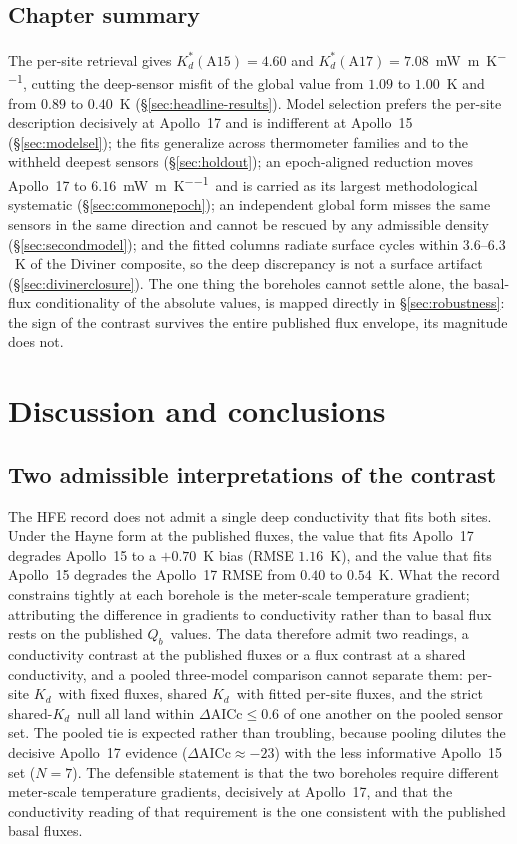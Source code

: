 \documentclass[11pt,a4paper,oneside]{report}
\newcommand{\Kd}{\ensuremath{K_d}}
\newcommand{\Kds}{\ensuremath{K_d^{*}}}
\newcommand{\Qb}{\ensuremath{Q_b}}
\newcommand{\mWmK}{\si{\milli\watt\per\meter\per\kelvin}}
\begin{document}
\section*{Chapter summary}
The per-site retrieval gives $\Kds(\mathrm{A15})=4.60$ and
$\Kds(\mathrm{A17})=7.08$~\mWmK, cutting the deep-sensor misfit of
the global value from $1.09$ to $1.00$~K and from $0.89$ to $0.40$~K
(\S\ref{sec:headline-results}). Model selection prefers the per-site
description decisively at Apollo~17 and is indifferent at Apollo~15
(\S\ref{sec:modelsel}); the fits generalize across thermometer
families and to the withheld deepest sensors (\S\ref{sec:holdout});
an epoch-aligned reduction moves Apollo~17 to $6.16$~\mWmK\ and is
carried as its largest methodological systematic
(\S\ref{sec:commonepoch}); an independent global form misses the same
sensors in the same direction and cannot be rescued by any admissible
density (\S\ref{sec:secondmodel}); and the fitted columns radiate
surface cycles within $3.6$--$6.3$~K of the Diviner composite, so the
deep discrepancy is not a surface artifact
(\S\ref{sec:divinerclosure}). The one thing the boreholes cannot
settle alone, the basal-flux conditionality of the absolute values,
is mapped directly in \S\ref{sec:robustness}: the sign of the
contrast survives the entire published flux envelope, its magnitude
does not.

\chapter{Discussion and conclusions}\label{ch:discussion}

\section{Two admissible interpretations of the contrast}\label{sec:tworeadings}
The HFE record does not admit a single deep conductivity that fits
both sites. Under the Hayne form at the published fluxes, the value
that fits Apollo~17 degrades Apollo~15 to a $+0.70$~K bias (RMSE
$1.16$~K), and the value that fits Apollo~15 degrades the Apollo~17
RMSE from $0.40$ to $0.54$~K. What the record constrains tightly at
each borehole is the meter-scale temperature gradient; attributing
the difference in gradients to conductivity rather than to basal flux
rests on the published \Qb\ values. The data therefore admit two
readings, a conductivity contrast at the published fluxes or a flux
contrast at a shared conductivity, and a pooled three-model
comparison cannot separate them: per-site \Kd\ with fixed fluxes,
shared \Kd\ with fitted per-site fluxes, and the strict shared-\Kd\
null all land within $\Delta\mathrm{AICc}\le0.6$ of one another on
the pooled sensor set. The pooled tie is expected rather than
troubling, because pooling dilutes the decisive Apollo~17 evidence
($\Delta\mathrm{AICc}\approx-23$) with the less informative Apollo~15
set ($N=7$). The defensible statement is that the two boreholes
require different meter-scale temperature gradients, decisively at
Apollo~17, and that the conductivity reading of that requirement is
the one consistent with the published basal fluxes.
\end{document}
